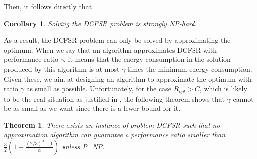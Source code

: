 \documentclass[10pt, conference, compsocconf]{IEEEtran}
\newtheorem{theorem}{Theorem}
\newtheorem{corollary}{Corollary}
\begin{document}
Then, it follows directly that
\begin{corollary}
Solving the DCFSR problem is strongly NP-hard.
\end{corollary}
As a result, the DCFSR problem can only be solved by approximating the optimum. When we say that an algorithm approximates DCFSR with performance ratio $\gamma$, it means that the energy consumption in the solution produced by this algorithm is at most $\gamma$ times the minimum energy consumption. Given these, we aim at designing an algorithm to approximate the optimum with ratio $\gamma$ as small as possible. Unfortunately, for the case $R_{opt} > C$, which is likely to be the real situation as justified in \cite{Wang_Zhang-JSAC-2013}, the following theorem shows that $\gamma$ cannot be as small as we want since there is a lower bound for it.

\begin{theorem}
There exists an instance of problem DCFSR such that no approximation algorithm can guarantee a performance ratio smaller than $\frac{3}{2} \left(1 + \frac{(2/3)^{\alpha}-1}{ \alpha}\right)$ unless P=NP.
\end{theorem}
\end{document}
